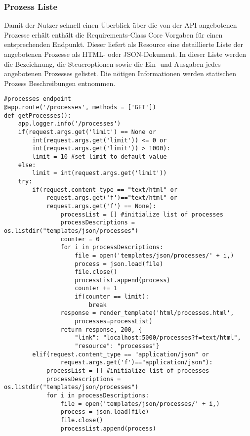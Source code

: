 \subsubsection{Prozess Liste}
Damit der Nutzer schnell einen Überblick über die von der API angebotenen Prozesse erhält enthält die Requirements-Class Core Vorgaben für einen entsprechenden Endpunkt.
Dieser liefert als Resource eine detaillierte Liste der angebotenen Prozesse als HTML- oder JSON-Dokument. In dieser Liste werden die Bezeichnung, die Steueroptionen sowie
die Ein- und Ausgaben jedes angebotenen Prozesses gelistet. Die nötigen Informationen werden statischen Prozess Beschreibungen entnommen. 

\begin{lstlisting}[caption={Process List Endpoint}, style = Python]
#processes endpoint
@app.route('/processes', methods = ['GET']) 
def getProcesses():
    app.logger.info('/processes') 
    if(request.args.get('limit') == None or 
        int(request.args.get('limit')) <= 0 or 
        int(request.args.get('limit')) > 1000): 
        limit = 10 #set limit to default value
    else:
        limit = int(request.args.get('limit'))
    try:
        if(request.content_type == "text/html" or
            request.args.get('f')=="text/html" or 
            request.args.get('f') == None): 
                processList = [] #initialize list of processes
                processDescriptions = os.listdir("templates/json/processes") 
                counter = 0
                for i in processDescriptions:
                    file = open('templates/json/processes/' + i,) 
                    process = json.load(file) 
                    file.close() 
                    processList.append(process) 
                    counter += 1 
                    if(counter == limit): 
                        break 
                response = render_template('html/processes.html', 
                    processes=processList) 
                return response, 200, {
                    "link": "localhost:5000/processes?f=text/html", 
                    "resource": "processes"} 
        elif(request.content_type == "application/json" or 
                request.args.get('f')=="application/json"): 
            processList = [] #initialize list of processes
            processDescriptions = os.listdir("templates/json/processes")     
            for i in processDescriptions: 
                file = open('templates/json/processes/' + i,) 
                process = json.load(file) 
                file.close() 
                processList.append(process) 

\end{lstlisting}
